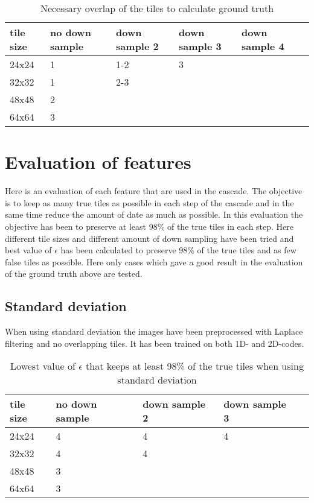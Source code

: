 \begin{table}[H]
\begin{center}
     \begin{tabular}{ | l | l | l | l | l | p{5cm} |}
     \hline
     tile size & no down sample & down sample 2 & down sample 3 & down sample 4 \\ \hline
   	 24x24 & 1 & 1-2 & 3 & 	\\ \hline
     32x32 & 1 & 2-3 &   & 	\\ \hline
     48x48 & 2 &     &   &  \\ \hline
     64x64 & 3 &     &   &	\\ \hline
     \end{tabular}
\end{center}
\caption{Necessary overlap of the tiles to calculate ground truth}
\end{table}

\section{Evaluation of features}
\label{sec:Evaluation of features}
Here is an evaluation of each feature that are used in the cascade. The objective is to keep as many true tiles as possible in each step of the cascade and in the same time reduce the amount of date as much as possible. In this evaluation the objective has been to preserve at least 98\% of the true tiles in each step. Here different tile sizes and different amount of down sampling have been tried and best value of $\epsilon$ has been calculated to preserve 98\% of the true tiles and as few false tiles as possible. Here only cases which gave a good result in the evaluation of the ground truth above are tested. 

\subsection{Standard deviation}
When using standard deviation the images have been preprocessed with Laplace filtering and no overlapping tiles. It has been trained on both 1D- and 2D-codes. 

\begin{table}[H]
\begin{center}
     \begin{tabular}{ | l | l | l | l | l |}
     \hline
     tile size & no down sample & down sample 2 & down sample 3 \\ \hline
   	 24x24 & 4 & 4 & 4 			\\ \hline
     32x32 & 4 & 4  & 			\\ \hline
     48x48 & 3 &     &  		\\ \hline
     64x64 & 3 &     &			\\ \hline
     \end{tabular}
\end{center}
\caption{Lowest value of $\epsilon$ that keeps at least 98\% of the true tiles when using standard deviation}
\end{table}

